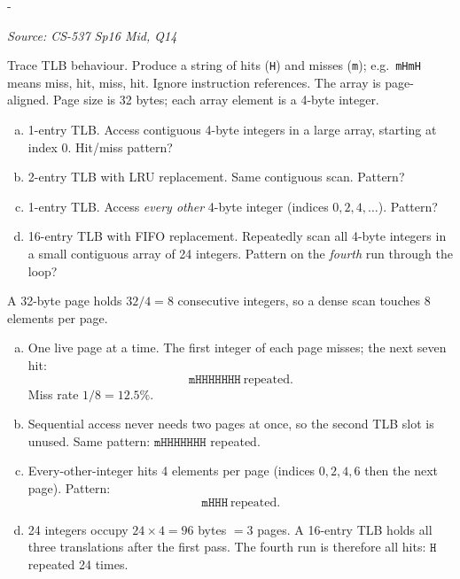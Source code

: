 \documentclass[11pt,a4paper]{article}
\makeatletter
\newcommand{\keepspace}[1]{\par\penalty-100\begingroup
  \setlength{\dimen@}{#1}\dimen@ii\pagegoal\advance\dimen@ii-\pagetotal
  \ifdim\dimen@>\dimen@ii\ifdim\dimen@ii>\z@\vfil\fi\break\fi\endgroup}
\newcounter{qn}[section]
\newenvironment{Qn}[4]{%
  \refstepcounter{qn}\keepspace{7\baselineskip}%
  \begin{tcolorbox}[qboxstyle, title={Q\thesection.\theqn\ \ [#1 \textbar\ #2]\ \ #4}]%
  {\footnotesize\color{g3}\textit{Source: #3}}\par\smallskip%
}{%
  \end{tcolorbox}%
}
\newenvironment{Sol}{%
  \begin{tcolorbox}[sboxstyle, title={Solution}]%
}{%
  \end{tcolorbox}\vspace{0.35em}%
}
\makeatother
\begin{document}
\begin{Qn}{Medium-Hard}{Lect 13}{CS-537 Sp16 Mid, Q14}{Hit/miss strings for sequential and strided array walks}
Trace TLB behaviour. Produce a string of hits (\texttt{H}) and misses
(\texttt{m}); e.g.\ \texttt{mHmH} means miss, hit, miss, hit. Ignore
instruction references. The array is page-aligned. Page size is 32 bytes;
each array element is a 4-byte integer.
\begin{enumerate}[(a)]
\item 1-entry TLB. Access contiguous 4-byte integers in a large array,
      starting at index 0. Hit/miss pattern?
\item 2-entry TLB with LRU replacement. Same contiguous scan. Pattern?
\item 1-entry TLB. Access \emph{every other} 4-byte integer (indices
      $0,2,4,\ldots$). Pattern?
\item 16-entry TLB with FIFO replacement. Repeatedly scan all 4-byte
      integers in a small contiguous array of 24 integers. Pattern on
      the \emph{fourth} run through the loop?
\end{enumerate}
\end{Qn}
\begin{Sol}
A 32-byte page holds $32/4 = 8$ consecutive integers, so a dense scan
touches 8 elements per page.
\begin{enumerate}[(a)]
\item One live page at a time. The first integer of each page misses;
      the next seven hit:
      \[
      \texttt{mHHHHHHH}\ \textrm{repeated}.
      \]
      Miss rate $1/8 = 12.5\%$.
\item Sequential access never needs two pages at once, so the second
      TLB slot is unused. Same pattern:
      $\texttt{mHHHHHHH}$ repeated.
\item Every-other-integer hits 4 elements per page (indices
      $0,2,4,6$ then the next page). Pattern:
      \[
      \texttt{mHHH}\ \textrm{repeated}.
      \]
\item 24 integers occupy $24\times 4 = 96$ bytes $= 3$ pages. A 16-entry
      TLB holds all three translations after the first pass. The fourth
      run is therefore all hits: $\texttt{H}$ repeated 24 times.
\end{enumerate}
\end{Sol}
\end{document}
